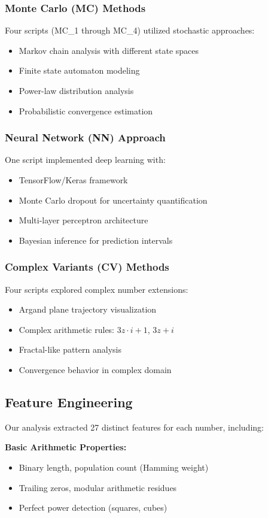 \documentclass[12pt,a4paper]{article}
\begin{document}
\subsubsection{Monte Carlo (MC) Methods}
Four scripts (MC\_1 through MC\_4) utilized stochastic approaches:
\begin{itemize}
\item Markov chain analysis with different state spaces
\item Finite state automaton modeling
\item Power-law distribution analysis
\item Probabilistic convergence estimation
\end{itemize}

\subsubsection{Neural Network (NN) Approach}
One script implemented deep learning with:
\begin{itemize}
\item TensorFlow/Keras framework
\item Monte Carlo dropout for uncertainty quantification
\item Multi-layer perceptron architecture
\item Bayesian inference for prediction intervals
\end{itemize}

\subsubsection{Complex Variants (CV) Methods}
Four scripts explored complex number extensions:
\begin{itemize}
\item Argand plane trajectory visualization
\item Complex arithmetic rules: $3z \cdot i + 1$, $3z + i$
\item Fractal-like pattern analysis
\item Convergence behavior in complex domain
\end{itemize}

\subsection{Feature Engineering}

Our analysis extracted 27 distinct features for each number, including:

\textbf{Basic Arithmetic Properties:}
\begin{itemize}
\item Binary length, population count (Hamming weight)
\item Trailing zeros, modular arithmetic residues
\item Perfect power detection (squares, cubes)
\end{itemize}
\end{document}

